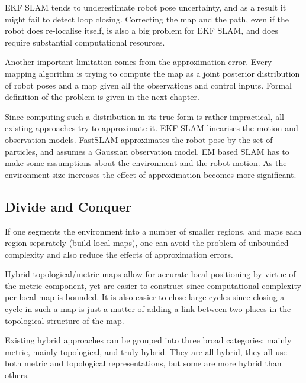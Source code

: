 EKF SLAM tends to underestimate robot pose uncertainty, and as a
result it might fail to detect loop closing. Correcting the map and
the path, even if the robot does re-localise itself, is also a big
problem for EKF SLAM, and does require substantial computational
resources.

Another important limitation comes from the approximation error. Every
mapping algorithm is trying to compute the map as a joint posterior
distribution of robot poses and a map given all the observations and
control inputs. Formal definition of the problem is given in the next
chapter.


Since computing such a distribution in its true form is rather
impractical, all existing approaches try to approximate it. EKF SLAM
linearises the motion and observation models. FastSLAM approximates
the robot pose by the set of particles, and assumes a Gaussian
observation model. EM based SLAM has to make some assumptions about
the environment and the robot motion. As the environment size
increases the effect of approximation becomes more significant.



\subsection{Divide and Conquer} 

If one segments the environment into a number of smaller regions, and
maps each region separately (build local maps), one can avoid the
problem of unbounded complexity and also reduce the effects of
approximation errors.

Hybrid topological/metric maps
\cite{fergusson2003,bosse03atlas,Thrun98a} allow for accurate local
positioning by virtue of the metric component, yet are easier to
construct since computational complexity per local map is bounded. It
is also easier to close large cycles since closing a cycle in such a
map is just a matter of adding a link between two places in the
topological structure of the map.

Existing hybrid approaches can be grouped into three broad
categories: mainly metric, mainly topological, and truly hybrid. They
are all hybrid, they all use both metric and topological
representations, but some are more hybrid than others.

